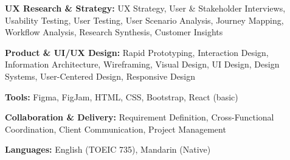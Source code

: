 

{\fontsize{9.5pt}{1.15em}\bodyfont\upshape\color{graytext}
\begin{cvitems}
  \item {\bfseries UX Research \& Strategy:} UX Strategy, User \& Stakeholder Interviews, Usability Testing, User Testing, User Scenario Analysis, Journey Mapping, Workflow Analysis, Research Synthesis, Customer Insights
  \item {\bfseries Product \& UI/UX Design:} Rapid Prototyping, Interaction Design, Information Architecture, Wireframing, Visual Design, UI Design, Design Systems, User-Centered Design, Responsive Design
  \item {\bfseries Tools:} Figma, FigJam, HTML, CSS, Bootstrap, React (basic)
  \item {\bfseries Collaboration \& Delivery:} Requirement Definition, Cross-Functional Coordination, Client Communication, Project Management
  \item {\bfseries Languages:} English (TOEIC 735), Mandarin (Native)
\end{cvitems}
}
